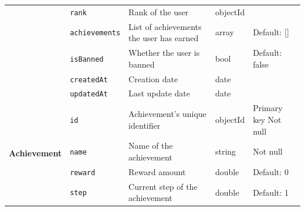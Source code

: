 \begin{landscape}
\begin{longtable}{ | m{} | m{} | m{} | m{} | m{} | }
        \cline{2-5}
                                                                         & \texttt{rank}                             & Rank of the user                                                     & objectId      &                               \\
        \cline{2-5}
                                                                         & \texttt{achievements}                     & List of achievements the user has earned                             & array         & Default: []                   \\
        \cline{2-5}
                                                                         & \texttt{isBanned}                         & Whether the user is banned                                           & bool          & Default: false                \\
        \cline{2-5}
                                                                         & \texttt{createdAt}                        & Creation date                                                        & date          &                               \\
        \cline{2-5}
                                                                         & \texttt{updatedAt}                        & Last update date                                                     & date          &                               \\
        \hline
        \multirow[t]{10}{5em}{\textbf{Achievement}}                      & \texttt{id}                               & Achievement's unique identifier                                      & objectId      & Primary key \newline Not null \\
        \cline{2-5}
                                                                         & \texttt{name}                             & Name of the achievement                                              & string        & Not null                      \\
        \cline{2-5}
                                                                         & \texttt{reward}                           & Reward amount                                                        & double        & Default: 0                    \\
        \cline{2-5}
                                                                         & \texttt{step}                             & Current step of the achievement                                      & double        & Default: 1                    \\

\end{longtable}
\end{landscape}
